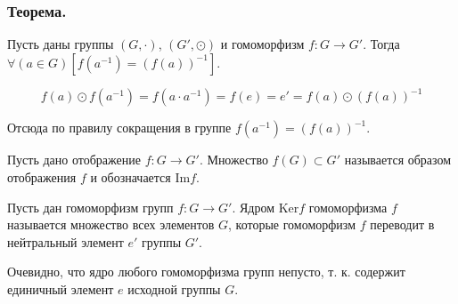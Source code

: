 \dokno

\subsubsection{Теорема.}
Пусть даны группы $(G,\cdot)$, $(G',\odot)$ и гомоморфизм $f:G \to G'$.
Тогда $\forall(a \in G)[f(a^{-1})=(f(a))^{-1}]$.

\dokvo

$$
f(a) \odot f(a^{-1}) = f(a \cdot a^{-1}) = f(e) = e' = f(a) \odot (f(a))^{-1}
$$

Отсюда по правилу сокращения в группе $f(a^{-1})=(f(a))^{-1}$.
\dokno

\opred
Пусть дано отображение $f:G \to G'$.
Множество $f(G) \subset G'$ называется образом отображения $f$ и обозначается $\mathrm{Im} f$.

\opred

Пусть дан гомоморфизм групп $f:G \to G'$.
Ядром $\mathrm{Ker} f$ гомоморфизма $f$ называется множество всех элементов $G$, которые гомоморфизм $f$ переводит в нейтральный элемент $e'$ группы $G'$.

Очевидно, что ядро любого гомоморфизма групп непусто, т. к. содержит единичный элемент $e$ исходной группы $G$. 








